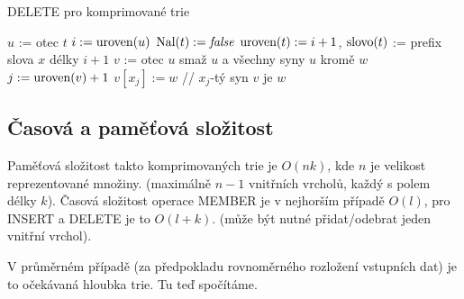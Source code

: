 \begin{algorithm}[!htb]
\caption{DELETE pro komprimované trie}
\label{alg:trie.k.del}
\begin{algorithmic}
\STATE {}
        \STATE $u$ := otec $t$
        \STATE $i := \textrm{uroven}(u)$
        \STATE $\textrm{Nal}(t) := \textit{false}$
        \STATE $\textrm{uroven}(t) := i+1$, $\textrm{slovo}(t)$ := prefix slova $x$ délky $i+1$
        \STATE {}
                \STATE $v$ := otec $u$
                \STATE smaž $u$ a všechny syny $u$ kromě $w$
                \STATE $j := \textrm{uroven}(v) + 1$
                \STATE $v[x_j] := w$ // $x_j$-tý syn $v$ je $w$
        \ENDIF
\ENDIF  
\end{algorithmic}
\end{algorithm}

\subsection{Časová a paměťová složitost}

Paměťová složitost takto komprimovaných trie je $O(nk)$, kde 
$n$ je velikost reprezentované množiny. (maximálně $n-1$ vnitřních vrcholů,
každý s polem délky $k$).
Časová složitost operace MEMBER je v nejhorším
případě $O(l)$, pro INSERT a DELETE je to $O(l+k)$. 
(může být nutné přidat/odebrat jeden vnitřní vrchol).

V průměrném případě (za předpokladu rovnoměrného
rozložení vstupních dat) je to očekávaná hloubka trie. Tu
teď spočítáme.

